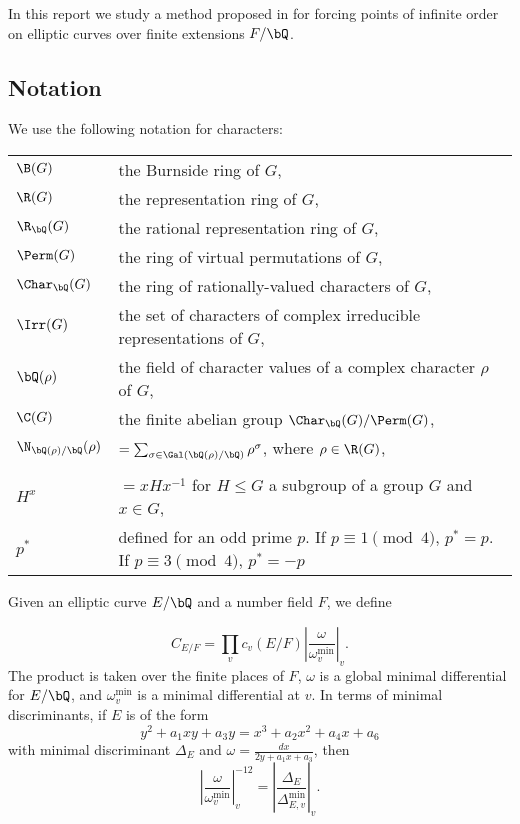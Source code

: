 In this report we study a method proposed in \cite{DEW1} for forcing points of infinite order on elliptic curves over finite extensions $F / \bQ$. 

\subsection*{Notation}
We use the following notation for characters:

\bigskip

\begin{tabular}{l | l}
    $\B(G)$ & the Burnside ring of $G$, \\
    $\R(G)$ & the representation ring of $G$, \\
    $\R_{\bQ}(G)$ & the rational representation ring of $G$, \\
    $\Perm(G)$ & the ring of virtual permutations of $G$, \\
    $\Char_{\bQ}(G)$ & the ring of rationally-valued characters of $G$,\\
    $\Irr(G)$ & the set of characters of complex irreducible representations of $G$, \\
    $\bQ(\rho)$ & the field of character values of a complex character $\rho$ of $G$, \\
    $\C(G)$ & the finite abelian group $\Char_{\bQ}(G) / \Perm(G)$, \\ 
    $\N_{\bQ(\rho) / \bQ}(\rho)$ &  $ = \sum_{\sigma \in \Gal(\bQ(\rho) / \bQ)} \rho^{\sigma}$, where $\rho \in \R(G)$,\\
    \\
    $H^{x}$ & $= xHx^{-1}$  for $H \leq G$ a subgroup of a group $G$ and $x \in G$,\\
    $p^*$ & defined for an odd prime $p$. If $p \equiv 1 \pmod 4$, $p^* = p$. If $p \equiv 3 \pmod 4$, $p^* = -p$
\end{tabular}
\vspace{2em}

Given an elliptic curve $E / \bQ$ and a number field $F$, we define

\[ C_{E / F} = \prod_v c_v(E / F) \left| \frac{\omega}{\omega_v^{\min}} \right|_v. \]
The product is taken over the finite places of $F$, $\omega$ is a global minimal differential for $E / \bQ$, and $\omega_v^{\min}$ is a minimal differential at $v$. In terms of minimal discriminants, if $E$ is of the form
\[ y^2 + a_1 x y + a_3 y = x^3 + a_2 x^2 + a_4 x + a_6 \]
with minimal discriminant $\Delta_E$ and $\omega = \frac{dx}{2 y + a_1 x + a_3}$, then
\[ \left| \frac{\omega}{\omega_v^{\min}} \right|_v^{-12} = \left| \frac{\Delta_E}{\Delta_{E, v}^{\min}} \right|_v . \]